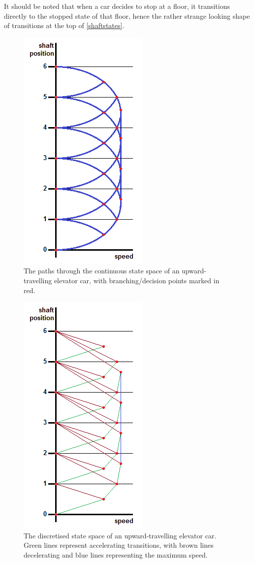 \documentclass{UoYCSproject}
\begin{document}
It should be noted that when a car decides to stop at a floor, it transitions directly to the stopped state of that floor, hence the rather strange looking shape of transitions at the top of \autoref{shaftstates}.

\begin{figure} [h]
	\centering
	\includegraphics{shaft_branching_points.png}
	\caption{The paths through the continuous state space of an upward-travelling elevator car, with branching/decision points marked in red.}
	\label{shaftbranching}
\end{figure}

\begin{figure} [h]
	\centering
	\includegraphics{shaft_state_space.png}
	\caption{The discretised state space of an upward-travelling elevator car.  Green lines represent accelerating transitions, with brown lines decelerating and blue lines representing the maximum speed.}
	\label{shaftstates}
\end{figure}
\end{document}
